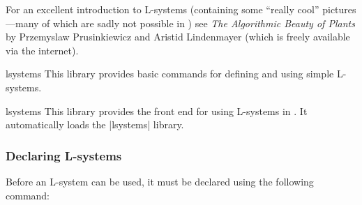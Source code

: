 For an excellent introduction to L-systems (containing some
``really cool'' pictures---many of which are sadly not possible in 
\pgfname)
see \emph{The Algorithmic Beauty of Plants} by 
Przemyslaw Prusinkiewicz and Aristid Lindenmayer (which is freely
available via the internet). 

\begin{pgflibrary}{lsystems}
  This library provides basic commands for defining and using 
  simple L-systems. 
\end{pgflibrary}

\begin{tikzlibrary}{lsystems}
  This library provides the front end for using L-systems in 
  \tikzname{}.  It automatically loads the \pgfname{} |lsystems| 
  library.
\end{tikzlibrary}



\subsubsection{Declaring L-systems}
  Before an L-system can be used, it must be declared using the
  following command:
  
